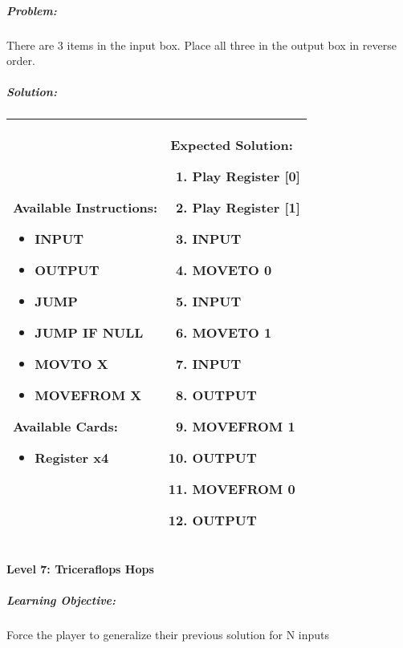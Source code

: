 \subparagraph{Problem:} There are 3 items in the input box. Place all three in the output box in reverse order.

\subparagraph{Solution:} 
\begin{center}
    \begin{tabular}{ | m{5cm} | m{9cm} | } 
        \hline
            \textbf{Available Instructions:} 
            \begin{itemize}
                \item INPUT
                \item OUTPUT
                \item JUMP
                \item JUMP IF NULL
                \item MOVTO X
                \item MOVEFROM X
            \end{itemize}
            \textbf{Available Cards:} 
            \begin{itemize}
                \item Register x4
            \end{itemize}& 
            \textbf{Expected Solution:} 
            \begin{enumerate}
                \item Play Register [0]
                \item Play Register [1]
                \item INPUT
                \item MOVETO 0
                \item INPUT
                \item MOVETO 1
                \item INPUT
                \item OUTPUT
                \item MOVEFROM 1 
                \item OUTPUT
                \item MOVEFROM 0 
                \item OUTPUT
            \end{enumerate}
            \\
        \hline
    \end{tabular}
\end{center}

\paragraph{Level 7: Triceraflops Hops}
\subparagraph{Learning Objective:} Force the player to generalize their previous solution for N inputs

